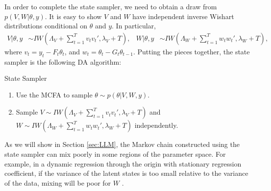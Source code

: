 \documentclass[12pt]{article}
\begin{document}
In order to complete the state sampler, we need to obtain a draw from $p(V,W|\theta,y)$. It is easy to show $V$ and $W$ have independent inverse Wishart distributions conditional on $\theta$ and $y$. In particular,
\begin{align*}
  V|\theta,y &\sim IW\left(\Lambda_V + \sum_{t=1}^Tv_tv_t',\lambda_V + T\right), &
  W|\theta,y &\sim IW\left(\Lambda_W + \sum_{t=1}^Tw_tw_t',\lambda_{W} + T\right), %
\end{align*}
where $v_t = y_t - F_t\theta_t$, and $w_t = \theta_t - G_t\theta_{t-1}$. Putting the pieces together, the state sampler is the following DA algorithm:
\begin{alg*}[State]State Sampler
\label{alg:DLMstate}
\begin{enumerate}
\item Use the MCFA to sample $\theta \sim p(\theta|V,W,y)$.
\item Sample $V \sim IW\left(\Lambda_V + \sum_{t=1}^Tv_tv_t',\lambda_V + T\right)$ and $W \sim IW\left(\Lambda_W + \sum_{t=1}^Tw_tw_t',\lambda_{W} + T\right)$ independently.
\end{enumerate}
\end{alg*}
\noindent As we will show in Section \ref{sec:LLM}, the Markov chain constructed using the state sampler can mix poorly in some regions of the parameter space. For example, in a dynamic regression through the origin with stationary regression coefficient, if the variance of the latent states is too small relative to the variance of the data, mixing will be poor for $W$ \citep{fruhwirth2004efficient}.
\end{document}
